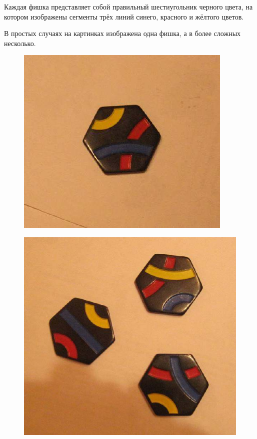 \documentclass[10pt]{article}
\begin{document}
	
	Каждая фишка представляет собой правильный шестиугольник черного цвета, на котором изображены сегменты трёх линий синего, красного и жёлтого цветов.
	
	В простых случаях на картинках изображена одна фишка, а в более сложных несколько.
	
	
	\begin{figure}[h]
		\begin{minipage}[h]{0.3\linewidth}
			\begin{center}
				{\includegraphics[width=1.0\linewidth]{data/Single_1-1.pdf}}
			\end{center}
		\end{minipage}
		\hfill
		\begin{minipage}[h]{0.3\linewidth}
			\begin{center}
				{\includegraphics[width=1.0\linewidth]{data/Group_1-1.pdf}}

\end{center}
\end{minipage}
\end{figure}
\end{document}

